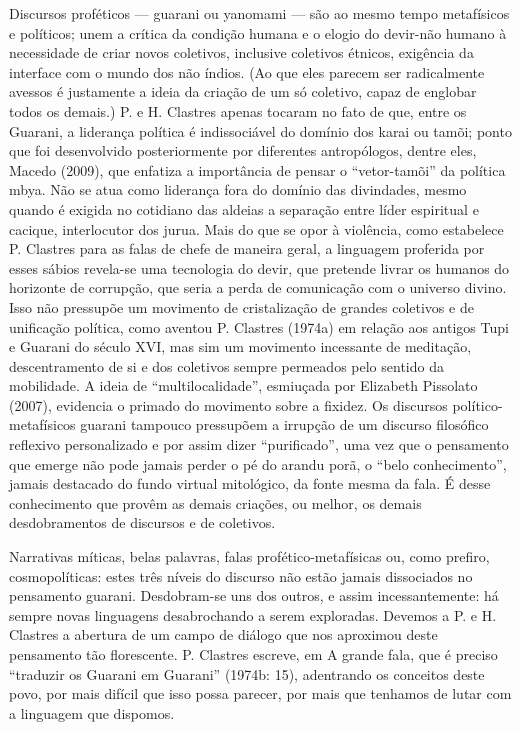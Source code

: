 Discursos proféticos — guarani ou yanomami — são ao mesmo tempo
metafísicos e políticos; unem a crítica da condição humana e o elogio
do devir-não humano à necessidade de criar novos coletivos, inclusive
coletivos étnicos, exigência da interface com o mundo dos não índios.
(Ao que eles parecem ser radicalmente avessos é justamente a ideia da
criação de um só coletivo, capaz de englobar todos os demais.) P. e H.
Clastres apenas tocaram no fato de que, entre os Guarani, a liderança
política é indissociável do domínio dos karai ou tamõi; ponto que foi
desenvolvido posteriormente por diferentes antropólogos, dentre eles,
Macedo (2009), que enfatiza a importância de pensar o ``vetor-tamõi'' da
política mbya. Não se atua como liderança fora do domínio das
divindades, mesmo quando é exigida no cotidiano das aldeias a separação
entre líder espiritual e cacique, interlocutor dos jurua. Mais do que
se opor à violência, como estabelece P. Clastres para as falas de chefe
de maneira geral, a linguagem proferida por esses sábios revela-se uma
tecnologia do devir, que pretende livrar os humanos do horizonte de
corrupção, que seria a perda de comunicação com o universo divino. Isso
não pressupõe um movimento de cristalização de grandes coletivos e de
unificação política, como aventou P. Clastres (1974a) em relação aos
antigos Tupi e Guarani do século XVI, mas sim um movimento incessante
de meditação, descentramento de si e dos coletivos sempre permeados
pelo sentido da mobilidade. A ideia de ``multilocalidade'', esmiuçada por
Elizabeth Pissolato (2007), evidencia o primado do movimento sobre a
fixidez. Os discursos político-metafísicos guarani tampouco pressupõem
a irrupção de um discurso filosófico reflexivo personalizado e por
assim dizer ``purificado'', uma vez que o pensamento que emerge não pode
jamais perder o pé do arandu porã, o ``belo conhecimento'', jamais
destacado do fundo virtual mitológico, da fonte mesma da fala. É desse
conhecimento que provêm as demais criações, ou melhor, os demais
desdobramentos de discursos e de coletivos.

Narrativas míticas, belas palavras, falas profético-metafísicas ou, como
prefiro, cosmopolíticas: estes três níveis do discurso não estão jamais
dissociados no pensamento guarani. Desdobram-se uns dos outros, e assim
incessantemente: há sempre novas linguagens desabrochando a serem
exploradas. Devemos a P. e H. Clastres a abertura de um campo de
diálogo que nos aproximou deste pensamento tão florescente. P. Clastres
escreve, em A grande fala, que é preciso ``traduzir os Guarani em
Guarani'' (1974b: 15), adentrando os conceitos deste povo, por mais
difícil que isso possa parecer, por mais que tenhamos de lutar com a
linguagem que dispomos. 

